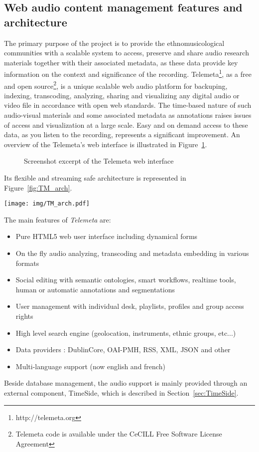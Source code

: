 \documentclass{sig-alternate}
\begin{document}
 \subsection{Web audio content management features and architecture}
The primary purpose of the project is to provide the ethnomusicological communities with a scalable system to access, preserve and share audio research materials together with their associated metadata, as these data provide key information on the context and significance of the recording. Telemeta\footnote{http://telemeta.org}, as a free and open source\footnote{Telemeta code is available under the CeCILL Free Software License Agreement}, is a unique scalable web audio platform for backuping, indexing, transcoding, analyzing, sharing and visualizing any digital audio or video file in accordance with open web standards.
The time-based nature of such audio-visual materials and some associated metadata as annotations raises issues of access and visualization at a large scale. Easy and on demand access to these data, as you listen to the recording, represents a significant improvement.
An overview of the Telemeta's web interface is illustrated in Figure~\ref{fig:Telemeta}.
\begin{figure}
   \centering
   \caption[1]{Screenshot excerpt of the Telemeta web interface}
    \label{fig:Telemeta}
 \end{figure}
Its flexible and streaming safe architecture is represented in Figure~\ref{fig:TM_arch}.
\begin{figure*}[htbp]
  \centering
  \texttt{[image: img/TM\_arch.pdf]}
  \caption{Telemeta architecture}\label{fig:TM_arch}
\end{figure*}
The main features of \emph{Telemeta} are:
      \begin{itemize}
      \item Pure HTML5 web user interface including dynamical forms
      \item On the fly audio analyzing, transcoding and metadata
        embedding in various formats
      \item Social editing with semantic ontologies, smart workflows,
        realtime tools, human or automatic annotations and
        segmentations
      \item User management with individual desk, playlists, profiles
        and group access rights
      \item High level search engine (geolocation, instruments, ethnic groups, etc...)
      \item Data providers : DublinCore, OAI-PMH, RSS, XML, JSON and other 
      \item Multi-language support (now english and french)
      \end{itemize}
Beside database management, the audio support is mainly provided through an external component, TimeSide, which is described in Section~\ref{sec:TimeSide}.
\end{document}
